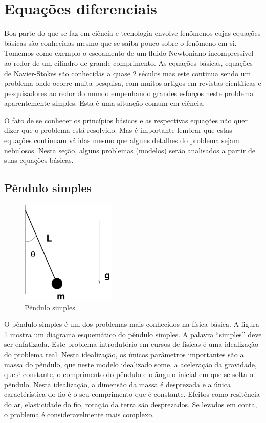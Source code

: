 \documentclass[article,12pt,oneside,a4paper,english,brazil,sumario=tradicional]{abntex2}
\begin{document}
\section{Equações diferenciais}
Boa parte do que se faz em ciência e tecnologia envolve fenômenos cujas equações básicas são conhecidas mesmo que se saiba pouco sobre o fenômeno em si. Tomemos como exemplo o escoamento de um fluido Newtoniano incompressível ao redor de um cilindro de grande comprimento. As equações básicas, equações de Navier-Stokes são conhecidas a quase 2 séculos mas este continua sendo um problema onde ocorre muita pesquisa, com muitos artigos em revistas científicas e pesquisadores ao redor do mundo empenhando grandes esforços neste problema aparentemente simples. Esta é uma situação comum em ciência. 

O fato de se conhecer os princípios básicos e as respectivas equações não quer dizer que o problema está resolvido. Mas é importante lembrar que estas equações continuam válidas mesmo que alguns detalhes do problema sejam nebulosos. Nesta seção, alguns problemas (modelos) serão analisados a partir de suas equações básicas.

\subsection{Pêndulo simples}

\begin{figure}
\centering
\includegraphics[width=0.4\textwidth]{./figuras/pendulo.pdf}
\vspace{0.5cm}
\caption{Pêndulo simples}
\label{fig:pendulo}
\end{figure}

O pêndulo simples é um dos problemas mais conhecidos na física básica. A figura \ref{fig:pendulo} mostra um diagrama esquemático do pêndulo simples. A palavra ``simples'' deve ser enfatizada. Este problema introdutório em cursos de físicas é uma idealização do problema real. Nesta idealização, os únicos parâmetros importantes são a massa do pêndulo, que neste modelo idealizado some, a aceleração da gravidade, que é constante, o comprimento do pêndulo e o ângulo inicial em que se solta o pêndulo. Nesta idealização, a dimensão da massa é desprezada e a única caractérística do fio é o seu comprimento que é constante. Efeitos como resitência do ar, elasticidade do fio, rotação da terra são desprezados. Se levados em conta, o problema é consideravelmente mais complexo. 
\end{document}
